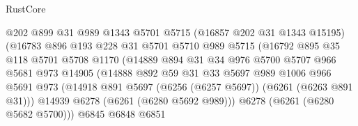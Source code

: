 \begin{lexlean}{RustCore}
\begin{coremodule}
                                @202
                                @899
                                @31
                                @989
                                @1343
                                @5701
                                @5715
                                (@16857 @202 @31 @1343 @15195)
                                (@16783
                                  @896
                                  @193
                                  @228
                                  @31
                                  @5701
                                  @5710
                                  @989
                                  @5715
                                  (@16792
                                    @895
                                    @35
                                    @118
                                    @5701
                                    @5708
                                    @1170
                                    (@14889
                                      @894
                                      @31
                                      @34
                                      @976
                                      @5700
                                      @5707
                                      @966
                                      @5681
                                      @973
                                      @14905
                                      (@14888
                                        @892
                                        @59
                                        @31
                                        @33
                                        @5697
                                        @989
                                        @1006
                                        @966
                                        @5691
                                        @973
                                        (@14918
                                          @891
                                          @5697
                                          (@6256 (@6257 @5697))
                                          (@6261 (@6263 @891 @31)))
                                        @14939
                                        @6278
                                        (@6261 (@6280 @5692 @989)))
                                      @6278
                                      (@6261 (@6280 @5682 @5700)))
                                    @6845
                                    @6848
                                    @6851

\end{coremodule}
\end{lexlean}
